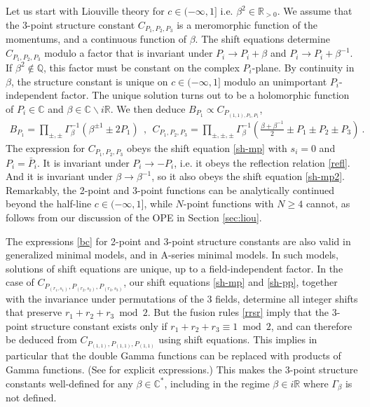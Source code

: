 \documentclass[12pt, a4paper]{article}
\begin{document}
Let us start with Liouville theory for $c\in (-\infty ,1]$ i.e. $\beta^2\in\mathbb{R}_{>0}$. 
We assume that the 3-point structure constant $C_{P_1,P_2,P_3}$ is a meromorphic function of the momentums, and a continuous function of $\beta$. 
The shift equations determine $C_{P_1,P_2,P_3}$ modulo a factor that is invariant under $P_i\to P_i+\beta$ and $P_i\to P_i+\beta^{-1}$. 
If $\beta^2\notin \mathbb{Q}$, this factor must be constant on the complex $P_i$-plane. By continuity in $\beta$, the structure constant is unique on $c\in (-\infty,1]$ modulo an unimportant $P_i$-independent factor. The unique solution turns out to be a holomorphic function of $P_i\in\mathbb{C}$ and $\beta\in \mathbb{C}\backslash i\mathbb{R}$. We then deduce $B_{P_1}\propto C_{P_{(1,1),P_1,P_1}}$,
\begin{align}
 \boxed{B_{P_1} = \prod_{\pm,\pm}\Gamma_\beta^{-1}\left(\beta^{\pm 1}\pm 2P_1\right)} 
  \ \  , \ \
  \boxed{C_{P_1,P_2,P_3} =\prod_{\pm,\pm,\pm} \Gamma_\beta^{-1}\left(\tfrac{\beta+\beta^{-1}}{2} \pm P_1\pm P_2\pm P_3\right)}
 \ . 
 \label{bc}
\end{align}
The expression for $C_{P_1,P_2,P_3}$ obeys the shift equation \eqref{sh-mp} with $s_i=0$ and $P_i=\bar P_i$.
It is invariant under $P_i\to -P_i$, i.e. it obeys the reflection relation \eqref{refl}.
And it is invariant under $\beta \to \beta^{-1}$, so it also obeys the shift equation \eqref{sh-mp2}. 
Remarkably, the 2-point and 3-point functions can be analytically continued beyond the half-line $c\in (-\infty ,1]$, while $N$-point functions with $N\geq 4$ cannot, as follows from our discussion of the OPE in Section \ref{sec:liou}. 

The expressions \eqref{bc} for 2-point and 3-point structure constants are also valid in generalized minimal models, and in A-series minimal models. In such models, solutions of shift equations are unique, up to a field-independent factor. In the case of $C_{P_{(r_1,s_1)},P_{(r_2,s_2)},P_{(r_3,s_3)}}$, our shift equations \eqref{sh-mp} and \eqref{sh-pp}, together with the invariance under permutations of the 3 fields, determine all integer shifts that preserve $r_1+r_2+r_3\bmod 2$. But the fusion rules \eqref{rrsr} imply that the 3-point structure constant exists only if $r_1+r_2+r_3\equiv 1\bmod 2$, and can therefore be deduced from $C_{P_{(1,1)},P_{(1,1)},P_{(1,1)}}$ using shift equations. This implies in particular that the double Gamma functions can be replaced with products of Gamma functions. (See \cite[Section 3.2.1]{rib14} for explicit expressions.) This makes the 3-point structure constants well-defined for any $\beta\in \mathbb{C}^*$, including in the regime $\beta\in i\mathbb{R}$ where $\Gamma_\beta$ is not defined.
\end{document}
